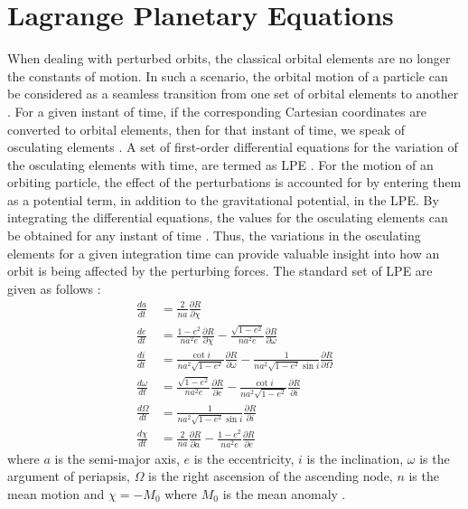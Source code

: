 \section{Lagrange Planetary Equations}
\label{sec:lpe}
When dealing with perturbed orbits, the classical orbital elements are no longer the constants of motion. In such a scenario, the orbital motion of a particle can be considered as a seamless transition from one set of orbital elements to another \cite{wakker}. For a given instant of time, if the corresponding Cartesian coordinates are converted to orbital elements, then for that instant of time, we speak of osculating elements \cite{wakker}. A set of first-order differential equations for the variation of the osculating elements with time, are termed as \gls{LPE} \cite{wakker}. For the motion of an orbiting particle, the effect of the perturbations is accounted for by entering them as a potential term, in addition to the gravitational potential, in the \gls{LPE}. By integrating the differential equations, the values for the osculating elements can be obtained for any instant of time \cite{wakker}. Thus, the variations in the osculating elements for a given integration time can provide valuable insight into how an orbit is being affected by the perturbing forces. The standard set of \gls{LPE} are given as follows \cite{scheeres2012orbit}:
\begin{align}
\frac{da}{dt} &= \frac{2}{na} \frac{\partial R}{\partial \chi} \\
\frac{de}{dt} &= \frac{1-e^2}{n a^2 e} \frac{\partial R}{\partial \chi} - \frac{\sqrt{1-e^2}}{na^2e} \frac{\partial R}{\partial \omega} \\
\frac{di}{dt} &= \frac{\cot{i}}{na^2\sqrt{1-e^2}}\frac{\partial R}{\partial \omega} - \frac{1}{na^2\sqrt{1-e^2}\sin{i}}\frac{\partial R}{\partial \Omega} \\
\frac{d\omega}{dt} &= \frac{\sqrt{1-e^2}}{na^2e}\frac{\partial R}{\partial e} - \frac{\cot{i}}{na^2\sqrt{1-e^2}} \frac{\partial R}{\partial i} \\
\frac{d\Omega}{dt} &= \frac{1}{na^2\sqrt{1-e^2}\sin{i}}\frac{\partial R}{\partial i} \\
\frac{d\chi}{dt} &= \frac{2}{na}\frac{\partial R}{\partial a} - \frac{1-e^2}{na^2e}\frac{\partial R}{\partial e}
\end{align}
where $a$ is the semi-major axis, $e$ is the eccentricity, $i$ is the inclination, $\omega$ is the argument of periapsis, $\Omega$ is the right ascension of the ascending node, $n$ is the mean motion and $\chi = -M_0$ where $M_0$ is the mean anomaly \cite{scheeres2012orbit}.

